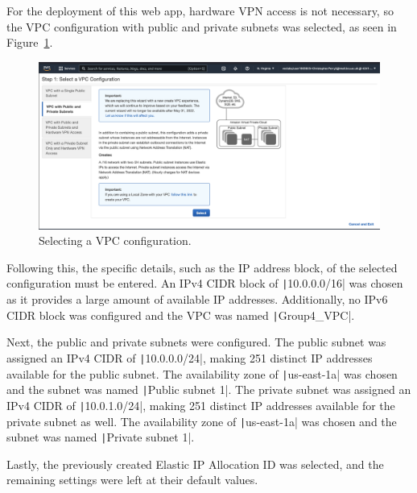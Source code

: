 For the deployment of this web app, hardware VPN access is not necessary, so the VPC configuration with public and
private subnets was selected, as seen in Figure~\ref{fig:vpc-step-1}.

\begin{figure}[!htbp]
    \centering
    \includegraphics[width=\textwidth]{resources/vpc/step_1_select_a_vpc_configuration}
    \caption{Selecting a VPC configuration.}
    \label{fig:vpc-step-1}
\end{figure}

Following this, the specific details, such as the IP address block, of the selected configuration must be entered.
An IPv4 CIDR block of \texttt|10.0.0.0/16| was chosen as it provides a large amount of available IP addresses.
Additionally, no IPv6 CIDR block was configured and the VPC was named \texttt|Group4_VPC|.

Next, the public and private subnets were configured.
The public subnet was assigned an IPv4 CIDR of \texttt|10.0.0.0/24|, making 251 distinct IP addresses available
for the public subnet.
The availability zone of \texttt|us-east-1a| was chosen and the subnet was named
\texttt|Public subnet 1|.
The private subnet was assigned an IPv4 CIDR of \texttt|10.0.1.0/24|, making 251 distinct IP addresses
available for the private subnet as well.
The availability zone of \texttt|us-east-1a| was chosen and the subnet was named
\texttt|Private subnet 1|.

Lastly, the previously created Elastic IP Allocation ID was selected, and the remaining settings were left at their
default values.

